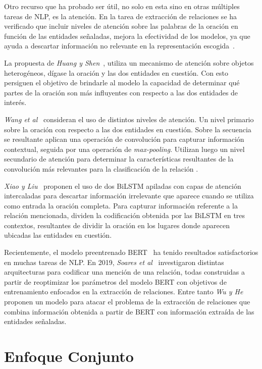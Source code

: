 Otro recurso que ha probado ser útil, no solo en esta sino en otras múltiples tareas de NLP, es la atención. 
En la tarea de extracción de relaciones se ha verificado que incluir niveles de atención sobre las palabras de la oración en función de las entidades señaladas, mejora la efectividad de los modelos, ya que ayuda a descartar información no relevante en la representación escogida~\cite{huang2016attention, wang2016relation, xiao2016semantic, lee2019semantic}.

La propuesta de \textit{Huang y Shen}~\cite{huang2016attention}, utiliza un mecanismo de atención sobre objetos heterogéneos, dígase la oración y las dos entidades en cuestión.
Con esto persiguen el objetivo de brindarle al modelo la capacidad de determinar qué partes de la oración son más influyentes con respecto a las dos entidades de interés.

\textit{Wang et al}~\cite{wang2016relation} consideran el uso de distintos niveles de atención.
Un nivel primario sobre la oración con respecto a las dos entidades en cuestión.
Sobre la secuencia se resultante aplican una operación de convolución para capturar información contextual, seguida por una operación de \textit{max-pooling}.
Utilizan luego un nivel secundario de atención para determinar la características resultantes de la convolución más relevantes para la clasificación de la relación .

\textit{Xiao y Liu}~\cite{xiao2016semantic} proponen el uso de dos BiLSTM apiladas con capas de atención intercaladas para descartar información irrelevante que aparece cuando se utiliza como entrada la oración completa.
Para capturar información referente a la relación mencionada, dividen la codificación obtenida por las BiLSTM en tres contextos, resultantes de dividir la oración en los lugares donde aparecen ubicadas las entidades en cuestión.

Recientemente, el modelo preentrenado BERT~\cite{BERT} ha tenido resultados satisfactorios en muchas tareas de NLP.
En 2019, \textit{Soares et al}~\cite{soares2019matching} investigaron distintas arquitecturas para codificar una mención de una relación, todas construidas a partir de reoptimizar los parámetros del modelo BERT con objetivos de entrenamiento enfocados en la extracción de relaciones. 
Entre tanto \textit{Wu y He}~\cite{wu2019enriching} proponen un modelo para atacar el problema de la extracción de relaciones que combina información obtenida a partir de BERT con información extraída de las entidades señaladas.

\section{Enfoque Conjunto}

